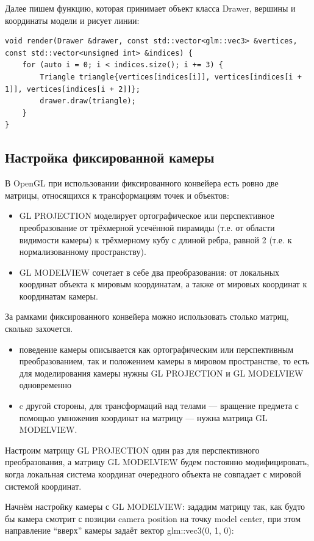 \documentclass[14pt,a4paper,report]{report}
\begin{document}
Далее пишем функцию, которая принимает объект класса Drawer, вершины и координаты модели и рисует линии:
\begin{lstlisting}
void render(Drawer &drawer, const std::vector<glm::vec3> &vertices, const std::vector<unsigned int> &indices) {
    for (auto i = 0; i < indices.size(); i += 3) {
        Triangle triangle{vertices[indices[i]], vertices[indices[i + 1]], vertices[indices[i + 2]]};
        drawer.draw(triangle);
    }
}
\end{lstlisting}

\subsection{Настройка фиксированной камеры}
В OpenGL при использовании фиксированного конвейера есть ровно две матрицы, относящихся к трансформациям точек и объектов:
\begin{itemize}

\item GL PROJECTION моделирует ортографическое или перспективное преобразование от трёхмерной усечённой пирамиды (т.е. от области видимости камеры) к трёхмерному кубу с длиной ребра, равной 2 (т.е. к нормализованному пространству).
\item GL MODELVIEW сочетает в себе два преобразования: от локальных координат объекта к мировым координатам, а также от мировых координат к координатам камеры.
\end{itemize}

За рамками фиксированного конвейера можно использовать столько матриц, сколько захочется. 

\begin{itemize}
\item поведение камеры описывается как ортографическим или перспективным преобразованием, так и положением камеры в мировом пространстве, то есть для моделирования камеры нужны GL PROJECTION и GL MODELVIEW одновременно
\item c другой стороны, для трансформаций над телами —  вращение предмета с помощью умножения координат на матрицу — нужна матрица GL MODELVIEW.
\end{itemize}

Настроим матрицу GL PROJECTION один раз для перспективного преобразования, а матрицу GL MODELVIEW будем постоянно модифицировать, когда локальная система координат очередного объекта не совпадает с мировой системой координат.

Начнём настройку камеры с GL MODELVIEW: зададим матрицу так, как будто бы камера смотрит с позиции camera position на точку model center, при этом направление “вверх” камеры задаёт вектор glm::vec3(0, 1, 0):
\end{document}
